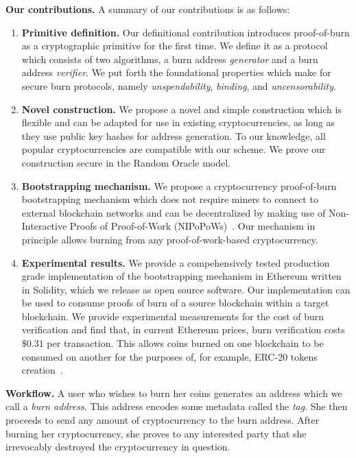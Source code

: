 \noindent
\textbf{Our contributions.}
A summary of our contributions is as follows:
\begin{enumerate}[wide, labelwidth=!, labelindent=0pt, label=(\roman*)]
    \item \textbf{Primitive definition.} Our definitional contribution introduces proof-of-burn as a cryptographic primitive for the first time. We
    define it as a protocol which consists of two algorithms, a burn address \emph{generator} and a burn address \emph{verifier}. We put forth the foundational properties which make for secure burn protocols, namely \emph{unspendability}, \emph{binding}, and \emph{uncensorability}.
    \item \textbf{Novel construction.} We propose a novel and simple construction which is flexible and can be adapted for use in existing cryptocurrencies, as long as they use public key hashes for address generation. To our knowledge, all popular cryptocurrencies are
    compatible with our scheme. We prove our construction secure in the Random Oracle model.
    \item \textbf{Bootstrapping mechanism.} We propose a cryptocurrency proof-of-burn bootstrapping mechanism which does not require miners to connect to external blockchain networks and can be decentralized by making use of Non-Interactive Proofs of Proof-of-Work (NIPoPoWs)~\cite{nipopows}. Our mechanism in principle allows burning from any proof-of-work-based cryptocurrency.
    \item \textbf{Experimental results.} We provide a compehensively tested production grade implementation of the bootstrapping mechanism in Ethereum
    written in Solidity, which we release as open source software. Our implementation can be used to consume proofs of burn of a source blockchain
    within a target blockchain. We provide experimental measurements for the cost of burn verification and find that, in current Ethereum prices,
    burn verification costs $\$0.31$ per transaction.
    This allows coins burned on one blockchain to be consumed on another for the purposes of, for example, ERC-20 tokens creation~\cite{erc20}.
\end{enumerate}

\noindent
\textbf{Workflow.}
A user who wishes to burn her coins generates an address which we call a \emph{burn address}.
This address encodes some metadata called the \emph{tag}. She then proceeds to send any amount of cryptocurrency to the burn address. After burning her cryptocurrency, she proves to any interested party that she irrevocably destroyed the cryptocurrency in question.

